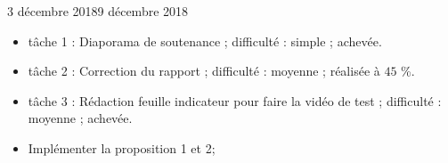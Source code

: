 \documentclass[12pt]{fiche-rd-info}
\begin{document}

\begin{fichesuivi}{3 décembre 2018}{9 décembre 2018}

	\begin{travaileffectue}
		\begin{itemize}
			\item tâche 1 : Diaporama de soutenance ; difficulté : simple ; achevée.
			\item tâche 2 : Correction du rapport ; difficulté : moyenne ; réalisée à  $45$ \%.
			\item tâche 3 : Rédaction feuille indicateur pour faire la vidéo de test ; difficulté : moyenne ; achevée.
		\end{itemize}
	\end{travaileffectue}



	\begin{planification}
		\begin{itemize}
			\item Implémenter la proposition 1 et 2;
		\end{itemize}
	\end{planification}
\end{fichesuivi}
\end{document}
